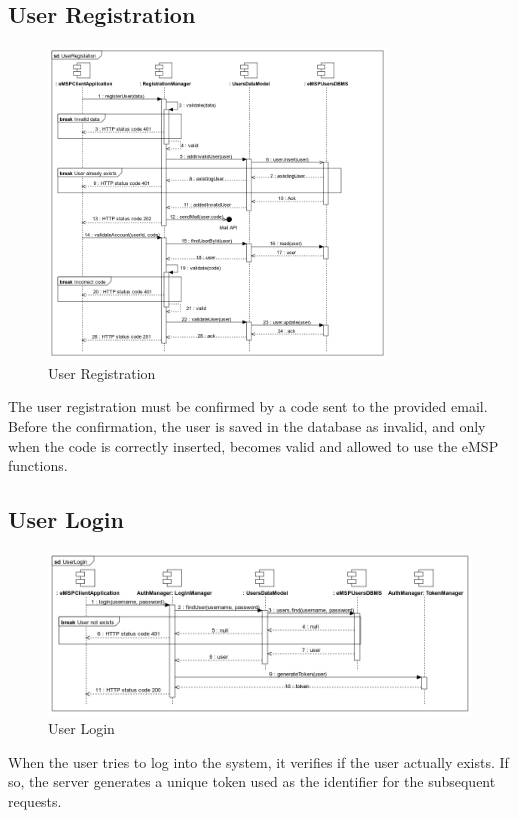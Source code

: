 \documentclass{Configuration_Files/PoliMi3i_thesis}
\begin{document}
\subsection{User Registration}
\begin{figure}[H]
    \centering
    \includegraphics[width=0.8\textwidth]{Images/sequenceDiagrams/UserRegistation.jpg}
    \caption{User Registration}
\end{figure}
The user registration must be confirmed by a code sent to the provided email. Before the confirmation, the user is saved in the database as invalid, and only when the code is correctly inserted, becomes valid and allowed to use the eMSP functions.

\subsection{User Login}
\begin{figure}[H]
    \centering
    \includegraphics[width=1\textwidth]{Images/sequenceDiagrams/UserLogin.jpg}
    \caption{User Login}
\end{figure}
When the user tries to log into the system, it verifies if the user actually exists. If so, the server generates a unique token used as the identifier for the subsequent requests.
\end{document}
